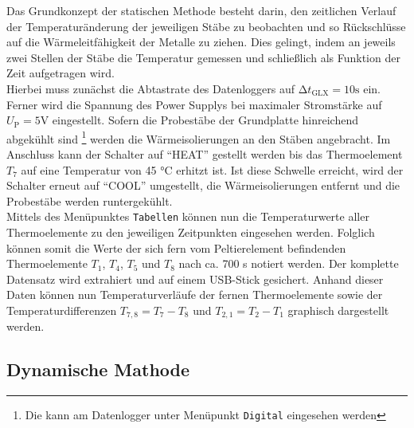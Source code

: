 Das Grundkonzept der statischen Methode besteht darin, den zeitlichen Verlauf der Temperaturänderung der jeweiligen Stäbe zu beobachten und so Rückschlüsse auf die
Wärmeleitfähigkeit der Metalle zu ziehen. Dies gelingt, indem an jeweils zwei Stellen der Stäbe die Temperatur gemessen und schließlich als Funktion der Zeit aufgetragen wird. \\
Hierbei muss zunächst die Abtastrate des Datenloggers auf $\increment t_\text{GLX} = 10\unit{\second}$ ein. Ferner wird die Spannung des Power Supplys bei maximaler Stromstärke auf 
$U_\text{P} = 5\unit{\volt}$ eingestellt. Sofern die Probestäbe der Grundplatte hinreichend abgekühlt sind \footnote{Die kann am Datenlogger unter Menüpunkt \texttt{Digital} eingesehen werden}
werden die Wärmeisolierungen an den Stäben angebracht. Im Anschluss kann der Schalter auf \enquote{HEAT} gestellt werden bis das Thermoelement $T_7$ auf eine Temperatur von 45 \unit{\celsius}
erhitzt ist. Ist diese Schwelle erreicht, wird der Schalter erneut auf \enquote{COOL} umgestellt, die Wärmeisolierungen entfernt und die Probestäbe werden runtergekühlt. \\
Mittels des Menüpunktes \texttt{Tabellen} können nun die Temperaturwerte aller Thermoelemente zu den jeweiligen Zeitpunkten eingesehen werden. Folglich können somit die Werte der
sich fern vom Peltierelement befindenden Thermoelemente $T_1$, $T_4$, $T_5$ und $T_8$ nach ca. 700 \unit{\second} notiert werden. Der komplette Datensatz wird extrahiert und auf einem USB-Stick
gesichert. Anhand dieser Daten können nun Temperaturverläufe der fernen Thermoelemente sowie der Temperaturdifferenzen $T_{7,8} = T_7 - T_8$ und $T_{2,1} = T_2 - T_1$ graphisch dargestellt werden.

\subsection{Dynamische Mathode}
\label{sec:Dynamische Methode}



